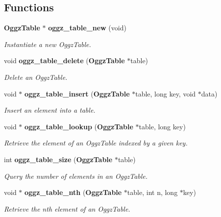 \subsection*{Functions}
\begin{CompactItemize}
\item 
{\bf Oggz\-Table} $\ast$ {\bf oggz\_\-table\_\-new} (void)
\begin{CompactList}\small\item\em Instantiate a new Oggz\-Table. \item\end{CompactList}\item 
void {\bf oggz\_\-table\_\-delete} ({\bf Oggz\-Table} $\ast$table)
\begin{CompactList}\small\item\em Delete an Oggz\-Table. \item\end{CompactList}\item 
void $\ast$ {\bf oggz\_\-table\_\-insert} ({\bf Oggz\-Table} $\ast$table, long key, void $\ast$data)
\begin{CompactList}\small\item\em Insert an element into a table. \item\end{CompactList}\item 
void $\ast$ {\bf oggz\_\-table\_\-lookup} ({\bf Oggz\-Table} $\ast$table, long key)
\begin{CompactList}\small\item\em Retrieve the element of an Oggz\-Table indexed by a given key. \item\end{CompactList}\item 
int {\bf oggz\_\-table\_\-size} ({\bf Oggz\-Table} $\ast$table)
\begin{CompactList}\small\item\em Query the number of elements in an Oggz\-Table. \item\end{CompactList}\item 
void $\ast$ {\bf oggz\_\-table\_\-nth} ({\bf Oggz\-Table} $\ast$table, int n, long $\ast$key)
\begin{CompactList}\small\item\em Retrieve the nth element of an Oggz\-Table. \item\end{CompactList}\end{CompactItemize}


